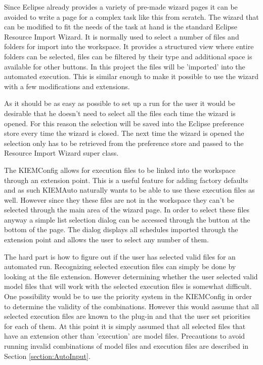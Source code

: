 Since Eclipse already provides a variety of pre-made wizard pages it can be avoided to write a page for a
complex task like this from scratch. The wizard that can be modified to fit the needs of the task at hand
is the standard Eclipse Resource Import Wizard. It is normally used to select a number of files and folders
for import into the workspace. It provides a structured view where entire folders can be selected, files
can be filtered by their type and additional space is available for other buttons. In this project the files
will be 'imported' into the automated execution. This is similar enough to make it possible to use the wizard
with a few modifications and extensions.

As it should be as easy as possible to set up a run for the user it would be desirable that he doesn't need
to select all the files each time the wizard is opened. For this reason the selection will be saved into
the Eclipse preference store every time the wizard is closed. The next time the wizard is opened the selection
only has to be retrieved from the preference store and passed to the Resource Import Wizard super class.

The \ac{KIEMConfig} allows for execution files to be linked into the workspace through an extension
point. This is a useful feature for adding factory defaults and as such \ac{KIEMAuto} naturally wants to
be able to use these execution files as well. However since they these files are not in the workspace they
can't be selected through the main area of the wizard page. In order to select these files anyway a simple
list selection dialog can be accessed through the button at the bottom of the page. The dialog displays all
schedules imported through the extension point and allows the user to select any number of them.

The hard part is how to figure out if the user has selected valid files for an automated run. Recognizing selected
execution files can simply be done by looking at the file extension.
However determining whether the user selected valid model files that will work with the selected execution
files is somewhat difficult. One possibility would be to use the priority system in the \ac{KIEMConfig} in
order to determine the validity of the combinations. However this would assume that all selected execution files
are known to the plug-in and that the user set priorities for each of them. At this point it is simply assumed
that all selected files that have an extension other than 'execution' are model files. Precautions to avoid
running invalid combinations of model files and execution files are described in Section \ref{section:AutoInput}.

